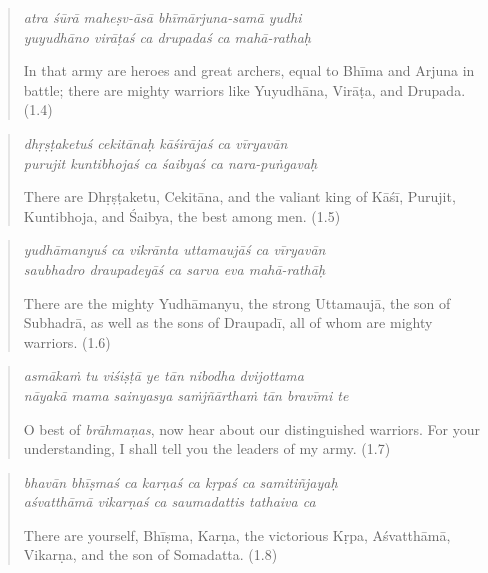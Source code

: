 \documentclass[12pt, twoside, openright]{memoir}
\begin{document}
\par
\begin{verse}
\textit{atra śūrā maheṣv-āsā bhīmārjuna-samā yudhi} \\
\textit{yuyudhāno virāṭaś ca drupadaś ca mahā-rathaḥ}

\noindent In that army are heroes and great archers, equal to Bhīma and Arjuna in battle; there are mighty warriors like Yuyudhāna, Virāṭa, and Drupada. (1.4)
\end{verse}
\par



\par
\begin{verse}
\textit{dhṛṣṭaketuś cekitānaḥ kāśirājaś ca vīryavān} \\
\textit{purujit kuntibhojaś ca śaibyaś ca nara-puṅgavaḥ}

\noindent There are Dhṛṣṭaketu, Cekitāna, and the valiant king of Kāśī, Purujit, Kuntibhoja, and Śaibya, the best among men. (1.5)
\end{verse}
\par



\par
\begin{verse}
\textit{yudhāmanyuś ca vikrānta uttamaujāś ca vīryavān} \\
\textit{saubhadro draupadeyāś ca sarva eva mahā-rathāḥ}

\noindent There are the mighty Yudhāmanyu, the strong Uttamaujā, the son of Subhadrā, as well as the sons of Draupadī, all of whom are mighty warriors. (1.6)
\end{verse}
\par



\par
\begin{verse}
\textit{asmākaṁ tu viśiṣṭā ye tān nibodha dvijottama} \\
\textit{nāyakā mama sainyasya saṁjñārthaṁ tān bravīmi te}

\noindent O best of \textit{brāhmaṇas}, now hear about our distinguished warriors. For your understanding, I shall tell you the leaders of my army. (1.7)
\end{verse}
\par



\par
\begin{verse}
\textit{bhavān bhīṣmaś ca karṇaś ca kṛpaś ca samitiñjayaḥ} \\
\textit{aśvatthāmā vikarṇaś ca saumadattis tathaiva ca}

\noindent There are yourself, Bhīṣma, Karṇa, the victorious Kṛpa, Aśvatthāmā, Vikarṇa, and the son of Somadatta. (1.8)
\end{verse}
\par
\end{document}
